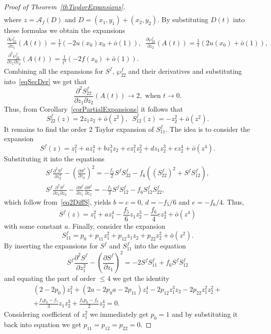\documentclass[10pt,a4paper]{amsart}
\begin{document}
\begin{proof}[Proof of Theorem~\ref{thTaylorExpansions}]
\[\begin{gathered}
		\end{gathered}
		\]
		where $z = \mathscr A_f(D)$ and $D = (x_1,y_1) + (x_2,y_2)$. By substituting $D(t)$ into these formulas we obtain the expansions
		\[
		\begin{gathered}
			\frac{\partial \wp_{22}^f}{\partial z_1}(A(t)) = \frac{1}{t}(-2u(x_0)x_0 + \bar{o}(1)),\;\;\frac{\partial \wp_{22}^f}{\partial z_2}(A(t)) = \frac{1}{t}(2u(x_0) + \bar{o}(1)),\\
			\frac{\partial^2 \wp_{22}^f}{\partial z_1 \partial z_2}(A(t)) = \frac{1}{t^2}(-2f(x_0) + \bar{o}(1)).
		\end{gathered}
		\]
		Combining all the expansions for $S^f$, $\wp_{22}^f$ and their derivatives and substituting into~\eqref{eqSecDer} we get that
		\[
		\frac{\partial^2 S_{22}^f}{\partial z_1 \partial z_2}(A(t)) \to 2,\text{ when }t \to 0.
		\]
		Thus, from Corollary~\ref{corPartialExpansions} it follows that
		\[
		S_{22}^f(z) = 2z_1z_2 + \bar{o}(z^2),\;\;S_{12}^f(z) = -z_2^2 + \bar{o}(z^2).
		\]
		It remains to find the order $2$ Taylor expansion of $S_{11}^f$. The idea is to consider the expansion
		\[
		S^f(z) = z_1^2 + az_1^4 + bz_1^3z_2 + cz_1^2z_2^2 + dz_1z_2^3 + ez_2^4 + \bar{o}(z^4).
		\]
		Substituting it into the equations
		\[
		\begin{gathered}
			S^f\frac{\partial^2 S^f}{\partial z_2^2} - \left(\frac{\partial S^f}{\partial z_2}\right)^2 = -\frac{f_5}{2}S^fS^f_{22}  - f_6\left(\left(S_{22}^f\right)^2 + S^fS_{12}^f\right), \\
			S^f\frac{\partial^2 S^f}{\partial z_1 \partial z_2} - \frac{\partial S^f}{\partial z_1}\frac{\partial S^f}{\partial z_2} = -\frac{f_5}{2}S^fS^f_{12}  - f_6S_{12}^fS_{22}^f,
		\end{gathered}
		\]
		which follow from~\eqref{eq2DiffS}, yields $b = c = 0$, $d = -f_5/6$ and $e = -f_6/4$. Thus,
		\[
		S^f(z) = z_1^2 + az_1^4 - \frac{f_5}{6}z_1z_2^3 - \frac{f_6}{4} ez_2^4 + \bar{o}(z^4)
		\]
		with some constant $a$. Finally, consider the expansion
		\[
		S_{11}^f = p_0 + p_{11}z_1^2 + p_{12}z_1z_2 + p_{22}z_2^2 + \bar{o}(z^2).
		\]
		By inserting the expansions for $S^f$ and $S_{11}^f$ into the equation
		\[
		S^f\frac{\partial^2 S^f}{\partial z_1^2} - \left(\frac{\partial S^f}{\partial z_1}\right)^2 = -2S^fS^f_{11}  + f_6S^fS_{12}^f
		\]
		and equating the part of order $\le 4$ we get the identity
		\begin{multline*}
		(2 - 2p_0)z_1^2 + (2a - 2p_0a - 2p_{11})z_1^4 - 2p_{12}z_1^3z_2 - 2p_{22}z_1^2z_2^2 + \\+ \frac{f_5 p_0 - f_5}{3}z_1 z_2^3 + \frac{f_6p_0 - f_6}{2}z_2^4 = 0.
		\end{multline*}
		Considering coefficient of $z_1^2$ we immediately get $p_0 = 1$ and by substituting it back into equation we get $p_{11} = p_{12} = p_{22} = 0$.
		
		
	\end{proof}
\end{document}
